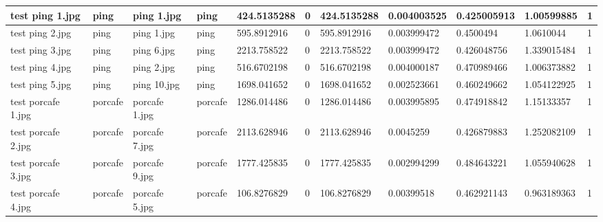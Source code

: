 \begin{landscape}
\begin{longtable}{|p{2cm}|p{1.5cm}|p{2cm}|p{1.5cm}|p{2cm}|p{1cm}|p{2cm}|p{2cm}|p{2cm}|p{2cm}|p{1cm}|}
		test ping 1.jpg      & ping             & ping 1.jpg            & ping                        & 424.5135288           & 0                       & 424.5135288                & 0.004003525           & 0.425005913           & 1.00599885               & 1                \\ \hline
		test ping 2.jpg      & ping             & ping 1.jpg            & ping                        & 595.8912916           & 0                       & 595.8912916                & 0.003999472           & 0.4500494             & 1.0610044                & 1                \\ \hline
		test ping 3.jpg      & ping             & ping 6.jpg            & ping                        & 2213.758522           & 0                       & 2213.758522                & 0.003999472           & 0.426048756           & 1.339015484              & 1                \\ \hline
		test ping 4.jpg      & ping             & ping 2.jpg            & ping                        & 516.6702198           & 0                       & 516.6702198                & 0.004000187           & 0.470989466           & 1.006373882              & 1                \\ \hline
		test ping 5.jpg      & ping             & ping 10.jpg           & ping                        & 1698.041652           & 0                       & 1698.041652                & 0.002523661           & 0.460249662           & 1.054122925              & 1                \\ \hline
		test porcafe 1.jpg   & porcafe          & porcafe 1.jpg         & porcafe                     & 1286.014486           & 0                       & 1286.014486                & 0.003995895           & 0.474918842           & 1.15133357               & 1                \\ \hline
		test porcafe 2.jpg   & porcafe          & porcafe 7.jpg         & porcafe                     & 2113.628946           & 0                       & 2113.628946                & 0.0045259             & 0.426879883           & 1.252082109              & 1                \\ \hline
		test porcafe 3.jpg   & porcafe          & porcafe 9.jpg         & porcafe                     & 1777.425835           & 0                       & 1777.425835                & 0.002994299           & 0.484643221           & 1.055940628              & 1                \\ \hline
		test porcafe 4.jpg   & porcafe          & porcafe 5.jpg         & porcafe                     & 106.8276829           & 0                       & 106.8276829                & 0.00399518            & 0.462921143           & 0.963189363              & 1                \\ \hline

\end{longtable}
\end{landscape}
